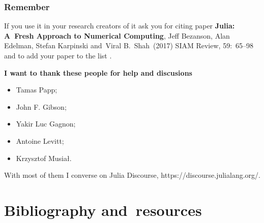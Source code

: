 \documentclass[10pt,t]{beamer}
\begin{document}
\begin{frame}
  \frametitle{Remember}


  \alert{If you use it in your research} creators of it ask you for
  citing paper \textbf{Julia: A~Fresh Approach to Numerical
    Computing}, Jeff Bezanson, Alan Edelman, Stefan Karpinski
  and~Viral B.~Shah~(2017) SIAM Review, 59:~65--98 and to add your
  paper to the list
  .

  \vspace{1em}



  \textbf{I want to thank these people for help and discusions}
  \begin{itemize}
    \RaggedRight

  \item Tamas Papp;

  \item John F. Gibson;

  \item Yakir Luc Gagnon;

  \item Antoine Levitt;

  \item Krzysztof Musiał.

  \end{itemize}

  With most of them I converse on Julia Discourse,
  {https://discourse.julialang.org/}.


\end{frame}










\appendix
















\section{Bibliography and~resources}
\end{document}

